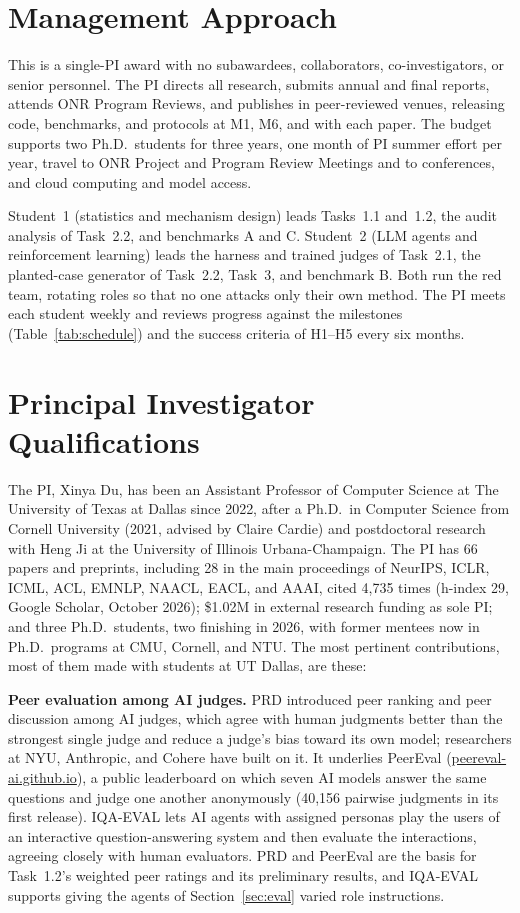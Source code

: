 \documentclass[12pt,letterpaper]{article}
\newcommand{\hd}[1]{\ifhmode\par\fi\addvspace{1pt}\noindent\textbf{#1}\hspace{0.35em}}
\begin{document}
\section{Management Approach}\label{sec:mgmt}
This is a single-PI award with no subawardees, collaborators, co-investigators, or senior personnel. The PI directs all research, submits annual and final reports, attends ONR Program Reviews, and publishes in peer-reviewed venues, releasing code, benchmarks, and protocols at M1, M6, and with each paper. The budget supports two Ph.D.\ students for three years, one month of PI summer effort per year, travel to ONR Project and Program Review Meetings and to conferences, and cloud computing and model access.

Student~1 (statistics and mechanism design) leads Tasks~1.1 and~1.2, the audit analysis of Task~2.2, and benchmarks A and C. Student~2 (LLM agents and reinforcement learning) leads the harness and trained judges of Task~2.1, the planted-case generator of Task~2.2, Task~3, and benchmark B. Both run the red team, rotating roles so that no one attacks only their own method. The PI meets each student weekly and reviews progress against the milestones (Table~\ref{tab:schedule}) and the success criteria of H1--H5 every six months.

\section{Principal Investigator Qualifications}\label{sec:pi}
The PI, Xinya Du, has been an Assistant Professor of Computer Science at The University of Texas at Dallas since 2022, after a Ph.D.\ in Computer Science from Cornell University (2021, advised by Claire Cardie) and postdoctoral research with Heng Ji at the University of Illinois Urbana-Champaign. The PI has 66 papers and preprints, including 28 in the main proceedings of NeurIPS, ICLR, ICML, ACL, EMNLP, NAACL, EACL, and AAAI, cited 4,735 times (h-index 29, Google Scholar, October 2026); \$1.02M in external research funding as sole PI; and three Ph.D.\ students, two finishing in 2026, with former mentees now in Ph.D.\ programs at CMU, Cornell, and NTU. The most pertinent contributions, most of them made with students at UT Dallas, are these:

\hd{Peer evaluation among AI judges.} PRD \citep{li2024prd} introduced peer ranking and peer discussion among AI judges, which agree with human judgments better than the strongest single judge and reduce a judge's bias toward its own model; researchers at NYU, Anthropic, and Cohere have built on it. It underlies PeerEval (\href{https://peereval-ai.github.io}{peereval-ai.github.io}), a public leaderboard on which seven AI models answer the same questions and judge one another anonymously (40,156 pairwise judgments in its first release). IQA-EVAL \citep{li2024iqa} lets AI agents with assigned personas play the users of an interactive question-answering system and then evaluate the interactions, agreeing closely with human evaluators. PRD and PeerEval are the basis for Task~1.2's weighted peer ratings and its preliminary results, and IQA-EVAL supports giving the agents of Section~\ref{sec:eval} varied role instructions.
\end{document}
